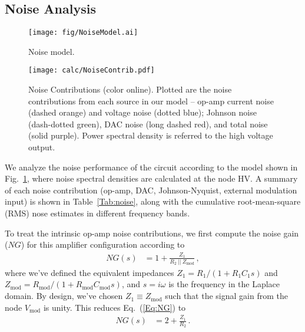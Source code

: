 \documentclass[aip,rsi,reprint]{revtex4-1} %
\newcommand{\epar}{~||~} %
\begin{document}
\subsection{Noise Analysis}
\label{Sec:NoiseAnalysis}

\begin{figure}[t]
\texttt{[image: fig/NoiseModel.ai]}
\caption{Noise model. \label{Fig:NoiseModel}}
\end{figure}
\begin{figure}[t]
\texttt{[image: calc/NoiseContrib.pdf]}
\caption{Noise Contributions (color online).  Plotted are the noise contributions from each source in our model -- op-amp current noise (dashed orange) and voltage noise (dotted blue); Johnson noise (dash-dotted green), DAC noise (long dashed red), and total noise (solid purple). Power spectral density is referred to the high voltage output.\label{Fig:NoisePlot}}
\end{figure}

We analyze the noise performance of the circuit according to the model shown in Fig.~\ref{Fig:NoiseModel}, where noise spectral densities are calculated at the node HV.
A summary of each noise contribution (op-amp, DAC, Johnson-Nyquist, external modulation input) is shown in Table~\ref{Tab:noise}, along with the cumulative root-mean-square (RMS) nose estimates in different frequency bands.

To treat the intrinsic op-amp noise contributions, we first compute the noise gain ($NG$) for this amplifier configuration according to
\begin{align}
\label{Eq:NG}
NG(s) &= 1 + \frac{Z_1}{R_2 \epar Z_{\text{mod}}}\,,
\end{align}
where we've defined the equivalent impedances $Z_1 = R_1/(1+R_1 C_1 s)$ and $Z_{\text{mod}} = R_{\text{mod}}/(1+R_{\text{mod}} C_{\text{mod}} s)$, and $s = i\omega$ is the frequency in the Laplace domain.
By design, we've chosen $Z_1 \equiv Z_{\text{mod}}$ such that the signal gain from the node $V_{\text{mod}}$ is unity.
This reduces Eq.~(\ref{Eq:NG}) to
\begin{align}
\label{Eq:RedNG}
NG(s) &= 2 + \frac{Z_1}{R_2}\,.
\end{align}
\end{document}
